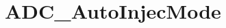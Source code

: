 \hypertarget{group___a_d_c___auto_injec_mode}{\section{A\-D\-C\-\_\-\-Auto\-Injec\-Mode}
\label{group___a_d_c___auto_injec_mode}
}
